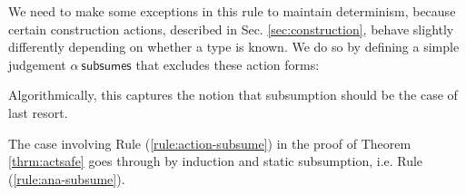 We need to make some exceptions in this rule to maintain determinism, because certain construction actions, described in Sec. \ref{sec:construction}, behave slightly differently depending on whether a type is known. We do so by defining a simple judgement $\alpha~\mathsf{subsumes}$ that excludes these action forms:
\begin{mathpar}
\end{mathpar}
Algorithmically, this captures the notion that subsumption should be the case of last resort.

The case involving Rule (\ref{rule:action-subsume}) in the proof of Theorem \ref{thrm:actsafe} goes through by induction and static subsumption, i.e. Rule (\ref{rule:ana-subsume}).

